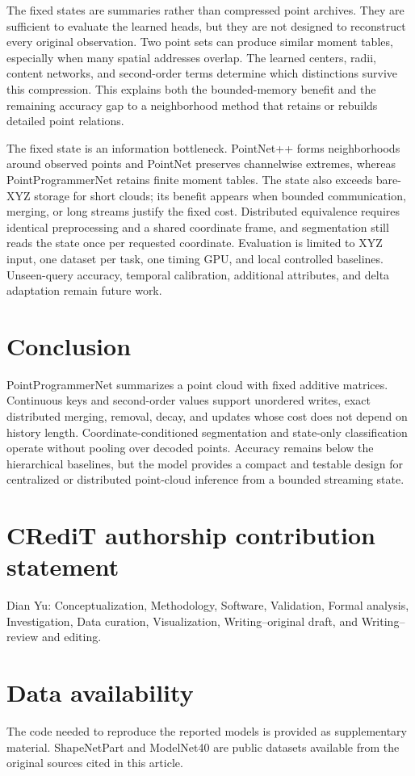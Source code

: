 \documentclass[times,twocolumn,final,authoryear]{elsarticle}
\begin{document}
The fixed states are summaries rather than compressed point archives. They are sufficient to evaluate the learned heads, but they are not designed to reconstruct every original observation. Two point sets can produce similar moment tables, especially when many spatial addresses overlap. The learned centers, radii, content networks, and second-order terms determine which distinctions survive this compression. This explains both the bounded-memory benefit and the remaining accuracy gap to a neighborhood method that retains or rebuilds detailed point relations.

The fixed state is an information bottleneck. PointNet++ forms neighborhoods around observed points and PointNet preserves channelwise extremes, whereas PointProgrammerNet retains finite moment tables. The state also exceeds bare-XYZ storage for short clouds; its benefit appears when bounded communication, merging, or long streams justify the fixed cost. Distributed equivalence requires identical preprocessing and a shared coordinate frame, and segmentation still reads the state once per requested coordinate. Evaluation is limited to XYZ input, one dataset per task, one timing GPU, and local controlled baselines. Unseen-query accuracy, temporal calibration, additional attributes, and delta adaptation remain future work.

\section{Conclusion}
PointProgrammerNet summarizes a point cloud with fixed additive matrices. Continuous keys and second-order values support unordered writes, exact distributed merging, removal, decay, and updates whose cost does not depend on history length. Coordinate-conditioned segmentation and state-only classification operate without pooling over decoded points. Accuracy remains below the hierarchical baselines, but the model provides a compact and testable design for centralized or distributed point-cloud inference from a bounded streaming state.

\section*{CRediT authorship contribution statement}
Dian Yu: Conceptualization, Methodology, Software, Validation, Formal analysis,
Investigation, Data curation, Visualization, Writing--original draft, and
Writing--review and editing.

\section*{Data availability}
The code needed to reproduce the reported models is provided as supplementary
material. ShapeNetPart and ModelNet40 are public datasets available from the
original sources cited in this article.


\end{document}
